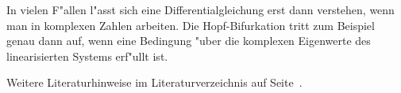 In vielen F"allen l"asst sich eine Differentialgleichung erst dann
verstehen, wenn man in komplexen Zahlen arbeiten. 
Die Hopf-Bifurkation tritt zum Beispiel genau dann auf, wenn eine
Bedingung "uber die komplexen Eigenwerte des linearisierten Systems
erf"ullt ist.

Weitere Literaturhinweise im Literaturverzeichnis auf
Seite~\pageref{skript:literatur}.


